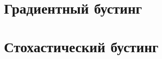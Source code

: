 \documentclass[specialist, 12pt, href]{article}
\begin{document}
\section{Градиентный бустинг}

\section{Стохастический бустинг}
\end{document}
